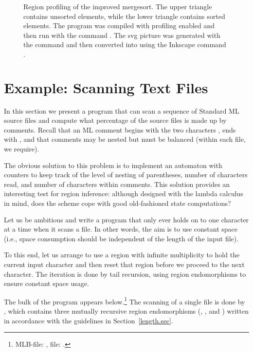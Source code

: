 \documentclass[12pt]{book}
\begin{document}
\begin{figure}
%
%
%
\caption{Region profiling of the improved mergesort.  The upper triangle
  contains unsorted elements, while the lower triangle contains sorted elements.
  The program was compiled with profiling enabled and then run with the command
  .  The svg picture  was
  generated with the command  and then
  converted into  using the Inkscape command .}
\label{msortreset.fig}
\end{figure}

\section{Example: Scanning Text Files}

\label{scan.sec}%
%
In this section we present a program that can
%
%
%
scan a sequence of Standard ML source files and compute what percentage of the
source files is made up by comments. Recall that an ML comment begins with the
two characters \kw{(*}, ends with \kw{*)}, and that comments may be nested but
must be balanced (within each file, we require).

The obvious solution to this problem is to implement an automaton with counters
to keep track of the level of nesting of parentheses, number of characters read,
and number of characters within comments. This solution provides an interesting
test for region inference: although designed with the lambda calculus in mind,
does the scheme cope with good old-fashioned state computations?

Let us be ambitious and write a program that only ever holds on to one character
at a time when it scans a file. In other words, the aim is to use constant space
(i.e., space consumption should be independent of the length of the input file).

To this end, let us arrange to use a region with infinite multiplicity to hold
the current input character and then reset that region before we proceed to the
next character. The iteration is done by tail recursion, using region
endomorphisms to ensure constant space usage.

The bulk of the program appears below.\footnote{MLB-file:
, file: .} The scanning of a
single file is done by , which contains three mutually recursive region
endomorphisms (, , and ) written in
accordance with the guidelines in Section~\ref{length.sec}.
\end{document}
